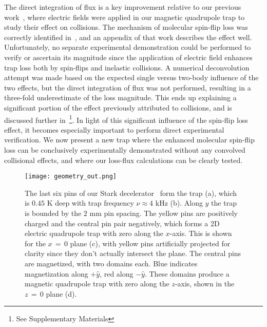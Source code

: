 \documentclass[%
 reprint,
 amsmath,amssymb,
 aps,
prl,
]{revtex4-1}
\begin{document}
The direct integration of flux is a key improvement relative to our previous work~\cite{Stuhl2013}, where electric fields were applied in our magnetic quadrupole trap to study their effect on collisions.
The mechanism of molecular spin-flip loss was correctly identified in~\cite{Stuhl2013}, and an appendix of that work describes the effect well. 
Unfortunately, no separate experimental demonstration could be performed to verify or ascertain its magnitude since the application of electric field enhances trap loss both by spin-flips and inelastic collisions.
A numerical deconvolution attempt was made based on the expected single versus two-body influence of the two effects, but the direct integration of flux was not performed, resulting in a three-fold underestimate of the loss magnitude.
This ends up explaining a significant portion of the effect previously attributed to collisions, and is discussed further in~\footnote{See Supplementary Materials}.
In light of this significant influence of the spin-flip loss effect, it becomes especially important to perform direct experimental verification.
We now present a new trap where the enhanced molecular spin-flip loss can be conclusively experimentally demonstrated without any convolved collisional effects, and where our loss-flux calculations can be clearly tested.





\begin{figure}[tb]
\texttt{[image: geometry\_out.png]}%
\caption{
The last six pins of our Stark decelerator~\cite{Sawyer2008} form the trap (a), which is $0.45\text{ K}$ deep with trap frequency $\nu\approx4\text{ kHz}$ (b). 
Along $y$ the trap is bounded by the $2\text{ mm}$ pin spacing. 
The yellow pins are positively charged and the central pin pair negatively, which forms a 2D electric quadrupole trap with zero along the $x$-axis. 
This is shown for the $x\,{=}\,0$ plane (c), with yellow pins artificially projected for clarity since they don't actually intersect the plane. 
The central pins are magnetized, with two domains each. 
Blue indicates magnetization along $+\hat{y}$, red along $-\hat{y}$. 
These domains produce a magnetic quadrupole trap with zero along the $z$-axis, shown in the $z\,{=}\,0$ plane (d). 
\label{fig:CAD}}
\end{figure}

\end{document}
